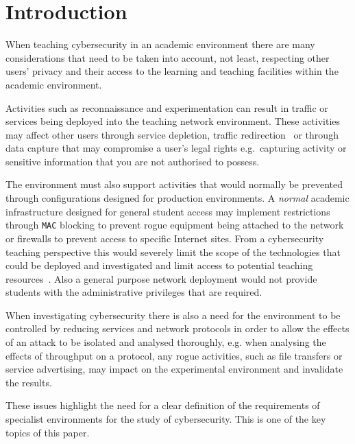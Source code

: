 \documentclass[10pt,journal]{IEEEtran}
\begin{document}
\section{Introduction}\label{intro}
When teaching cybersecurity in an academic environment there are many
considerations that need to be taken into account, not least, respecting other
users' privacy and their access to the learning and teaching facilities within
the academic environment.

Activities such as reconnaissance and experimentation can result in traffic or
services being deployed into the teaching network environment. These activities
may affect other users through service depletion, traffic
redirection~\cite{ACGO:06,LR:06} or through data capture that may compromise a
user's legal rights e.g.\ capturing activity or sensitive information that you
are not authorised to possess.

The environment must also support activities that would normally be prevented
through configurations designed for production environments. A \emph{normal}
academic infrastructure designed for general student access may implement
restrictions through \texttt{MAC} blocking to prevent rogue equipment being
attached to the network or firewalls to prevent access to specific Internet
sites. From a cybersecurity teaching perspective this would severely limit the
scope of the technologies that could be deployed and investigated and limit
access to potential teaching resources~\cite{ACGO:06,YYLCHJ:04}. Also a general
purpose network deployment would not provide students with the administrative
privileges that are required.

When investigating cybersecurity there is also a need for the environment to be
controlled by reducing services and network protocols in order to allow the
effects of an attack to be isolated and analysed thoroughly, e.g. when
analysing the effects of throughput on a protocol, any rogue activities, such
as file transfers or service advertising, may impact on the experimental
environment and invalidate the results.

These issues highlight the need for a clear definition of the requirements of
specialist environments for the study of cybersecurity. This is one of the
key topics of this paper.
\end{document}
